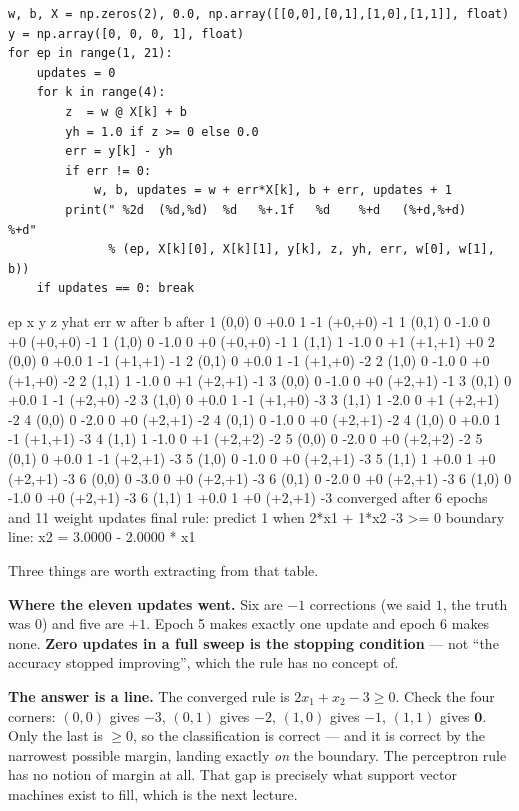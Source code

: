\documentclass[11pt]{article}
\begin{document}
\begin{lstlisting}
w, b, X = np.zeros(2), 0.0, np.array([[0,0],[0,1],[1,0],[1,1]], float)
y = np.array([0, 0, 0, 1], float)
for ep in range(1, 21):
    updates = 0
    for k in range(4):
        z  = w @ X[k] + b
        yh = 1.0 if z >= 0 else 0.0
        err = y[k] - yh
        if err != 0:
            w, b, updates = w + err*X[k], b + err, updates + 1
        print(" %2d  (%d,%d)  %d   %+.1f   %d    %+d   (%+d,%+d)     %+d"
              % (ep, X[k][0], X[k][1], y[k], z, yh, err, w[0], w[1], b))
    if updates == 0: break
\end{lstlisting}
\begin{codeout}
 ep  x        y  z      yhat  err   w after      b after
  1  (0,0)  0   +0.0   1    -1   (+0,+0)     -1
  1  (0,1)  0   -1.0   0    +0   (+0,+0)     -1
  1  (1,0)  0   -1.0   0    +0   (+0,+0)     -1
  1  (1,1)  1   -1.0   0    +1   (+1,+1)     +0
  2  (0,0)  0   +0.0   1    -1   (+1,+1)     -1
  2  (0,1)  0   +0.0   1    -1   (+1,+0)     -2
  2  (1,0)  0   -1.0   0    +0   (+1,+0)     -2
  2  (1,1)  1   -1.0   0    +1   (+2,+1)     -1
  3  (0,0)  0   -1.0   0    +0   (+2,+1)     -1
  3  (0,1)  0   +0.0   1    -1   (+2,+0)     -2
  3  (1,0)  0   +0.0   1    -1   (+1,+0)     -3
  3  (1,1)  1   -2.0   0    +1   (+2,+1)     -2
  4  (0,0)  0   -2.0   0    +0   (+2,+1)     -2
  4  (0,1)  0   -1.0   0    +0   (+2,+1)     -2
  4  (1,0)  0   +0.0   1    -1   (+1,+1)     -3
  4  (1,1)  1   -1.0   0    +1   (+2,+2)     -2
  5  (0,0)  0   -2.0   0    +0   (+2,+2)     -2
  5  (0,1)  0   +0.0   1    -1   (+2,+1)     -3
  5  (1,0)  0   -1.0   0    +0   (+2,+1)     -3
  5  (1,1)  1   +0.0   1    +0   (+2,+1)     -3
  6  (0,0)  0   -3.0   0    +0   (+2,+1)     -3
  6  (0,1)  0   -2.0   0    +0   (+2,+1)     -3
  6  (1,0)  0   -1.0   0    +0   (+2,+1)     -3
  6  (1,1)  1   +0.0   1    +0   (+2,+1)     -3
converged after 6 epochs and 11 weight updates
final rule: predict 1 when 2*x1 + 1*x2 -3 >= 0
boundary line: x2 = 3.0000 - 2.0000 * x1
\end{codeout}

Three things are worth extracting from that table.

\textbf{Where the eleven updates went.} Six are $-1$ corrections (we said $1$,
the truth was $0$) and five are $+1$. Epoch 5 makes exactly one update and
epoch 6 makes none. \textbf{Zero updates in a full sweep is the stopping
condition} --- not ``the accuracy stopped improving'', which the rule has no
concept of.

\textbf{The answer is a line.} The converged rule is
$2x_1 + x_2 - 3 \ge 0$. Check the four corners: $(0,0)$ gives $-3$, $(0,1)$
gives $-2$, $(1,0)$ gives $-1$, $(1,1)$ gives $\mathbf{0}$. Only the last is
$\ge 0$, so the classification is correct --- and it is correct by the
narrowest possible margin, landing exactly \emph{on} the boundary. The
perceptron rule has no notion of margin at all. That gap is precisely what
support vector machines exist to fill, which is the next lecture.
\end{document}
